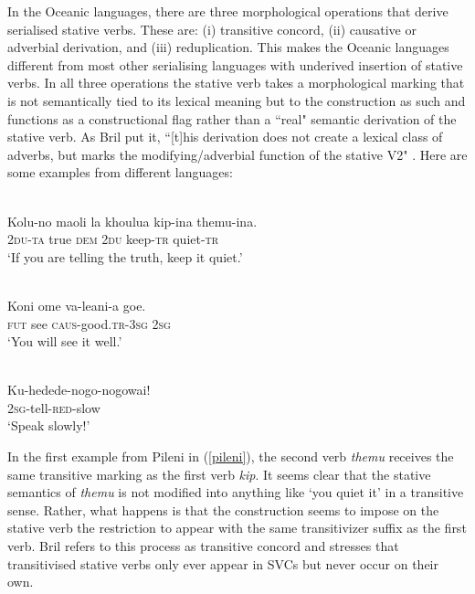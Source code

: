 In the Oceanic languages, there are three morphological operations that derive serialised stative verbs. These are: (i) transitive concord, (ii) causative or adverbial derivation, and (iii) reduplication. This makes the Oceanic languages different from most other serialising languages with underived insertion of stative verbs. In all three operations the stative verb takes a morphological marking that is not semantically tied to its lexical meaning but to the construction as such and functions as a constructional flag rather than a ``real" semantic derivation of the stative verb. As Bril put it, ``[t]his derivation does not create a lexical class of adverbs, but marks the modifying/adverbial function of the stative V2" \citep[273]{bril2007nexus}. Here are some examples from different languages:

\ea \label{pileni}
\\
\gll Kolu-no maoli la khoulua kip-ina themu-ina. \\
\textsc{2}\textsc{du}-\textsc{ta} true \textsc{dem} \textsc{2}\textsc{du} keep-\textsc{tr} quiet-\textsc{tr} \\
\glft `If you are telling the truth, keep it quiet.’\\ 
\z

\ea \label{hoava}
\\
\gll Koni ome va-leani-a goe. \\
\textsc{fut} see \textsc{caus}-good.\textsc{tr}-\textsc{3}\textsc{sg} \textsc{2}\textsc{sg} \\
\glft `You will see it well.’\\ 
\z

\ea \label{saliba}
\\
\gll Ku-hedede-nogo-nogowai! \\
\textsc{2}\textsc{sg}-tell-\textsc{red}-slow \\
\glft `Speak slowly!’\\ 
\z

In the first example from Pileni in (\ref{pileni}), the second verb \textit{themu} receives the same transitive marking as the first verb \textit{kip}. It seems clear that the stative semantics of \textit{themu} is not modified into anything like `you quiet it' in a transitive sense. Rather, what happens is that the construction seems to impose on the stative verb the restriction to appear with the same transitivizer suffix as the first verb. Bril refers to this process as transitive concord and stresses that transitivised stative verbs only ever appear in SVCs but never occur on their own.

